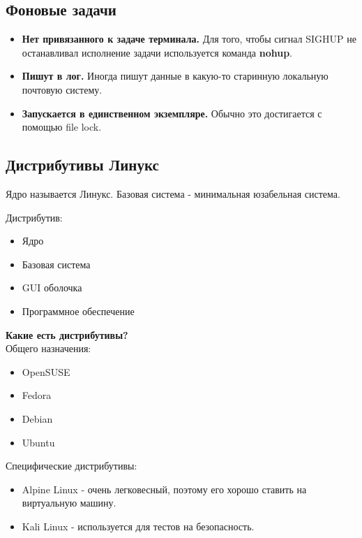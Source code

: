 \subsection{Фоновые задачи}

\begin{itemize}
	\item \textbf{Нет привязанного к задаче терминала.} Для того, чтобы сигнал SIGHUP
	не останавливал исполнение задачи используется команда \textbf{nohup}.
	\item \textbf{Пишут в лог.} Иногда пишут данные в какую-то старинную 
	локальную почтовую систему.
	\item \textbf{Запускается в единственном экземпляре.} Обычно это достигается
	с помощью file lock.
\end{itemize}

\subsection{Дистрибутивы Линукс}

Ядро называется Линукс. Базовая система - минимальная юзабельная система.

Дистрибутив:
\begin{itemize}
	\item Ядро
	\item Базовая система
	\item GUI оболочка
	\item Программное обеспечение 
\end{itemize}

\textbf{Какие есть дистрибутивы?} \\
Общего назначения:
\begin{itemize}
	\item OpenSUSE
	\item Fedora
	\item Debian
	\item Ubuntu
\end{itemize}

Специфические дистрибутивы:
\begin{itemize}
	\item Alpine Linux - очень легковесный, поэтому его
	хорошо ставить на виртуальную машину.
	\item Kali Linux - используется для тестов на безопасность.
\end{itemize}

